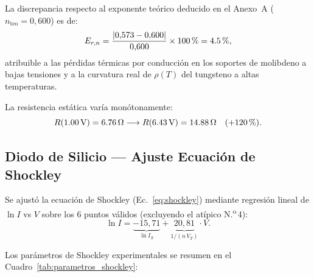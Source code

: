 La discrepancia respecto al exponente teórico deducido en el Anexo~A ($n_{\text{teo}} = 0{,}600$) es de:
\begin{equation}
    E_{r,n} = \frac{|0{,}573 - 0{,}600|}{0{,}600} \times \qty{100}{\percent} = \qty{4{,}5}{\percent},
\end{equation}
atribuible a las pérdidas térmicas por conducción en los soportes de molibdeno a bajas tensiones y a la curvatura real de $\rho(T)$ del tungsteno a altas temperaturas.

La resistencia estática varía monótonamente:
\begin{equation}
    R(\qty{1{,}00}{\volt}) = \qty{6{,}76}{\ohm} \longrightarrow R(\qty{6{,}43}{\volt}) = \qty{14{,}88}{\ohm} \quad (+\qty{120}{\percent}).
\end{equation}

\subsection{Diodo de Silicio --- Ajuste Ecuación de Shockley}

Se ajustó la ecuación de Shockley (Ec.~\eqref{eq:shockley}) mediante regresión lineal de $\ln I$ vs $V$ sobre los 6 puntos válidos (excluyendo el atípico N.\textsuperscript{o}\,4):
\begin{equation}
    \ln I = \underbrace{-15{,}71}_{\ln I_S} + \underbrace{20{,}81}_{1/(n\,V_T)} \cdot V.
\end{equation}

Los parámetros de Shockley experimentales se resumen en el Cuadro~\ref{tab:parametros_shockley}:

\begin{table}[H]
    \centering
    \caption{Parámetros de la ecuación de Shockley obtenidos experimentalmente versus rango teórico para diodos de silicio a \qty{25}{\celsius}.}
    \label{tab:parametros_shockley}
\end{table}

